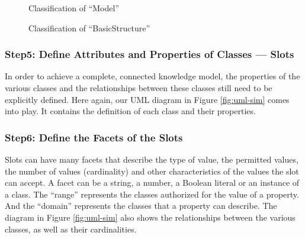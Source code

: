     \begin{figure}
        \centering
        \caption{\label{fig:classi-model} Classification of “Model”}
    \end{figure}
    
    \begin{figure}
        \centering
        \caption{\label{fig:classi-basic-struct} Classification of “BasicStructure”}
    \end{figure}
    

    
    \subsubsection{Step5: Define Attributes and Properties of Classes — Slots}
    In order to achieve a complete, connected knowledge model, the properties of the various classes and the relationships between these classes still need to be explicitly defined. Here again, our UML diagram in Figure \ref{fig:uml-sim} comes into play. It contains the definition of each class and their properties.
    
    
    \subsubsection{Step6: Define the Facets of the Slots}
    Slots can have many facets that describe the type of value, the permitted values, the number of values (cardinality) and other characteristics of the values the slot can accept. A facet can be a string, a number, a Boolean literal or an instance of a class. The “range” represents the classes authorized for the value of a property. And the “domain” represents the classes that a property can describe. The diagram in Figure \ref{fig:uml-sim} also shows the relationships between the various classes, as well as their cardinalities.
    

